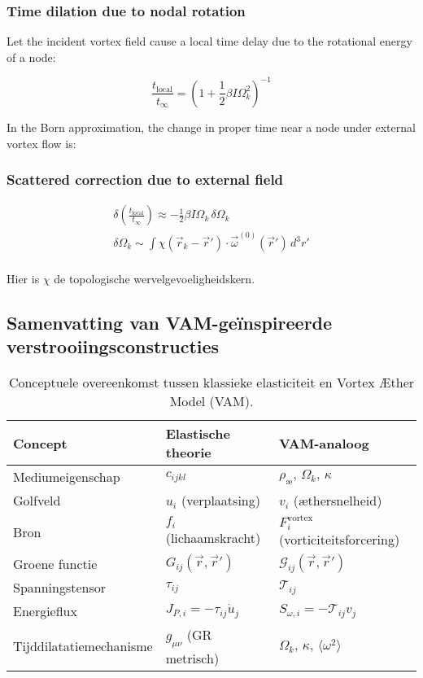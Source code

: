 \subsubsection*{Time dilation due to nodal rotation}

Let the incident vortex field cause a local time delay due to the rotational energy of a node:

\[
    \frac{t_{\text{local}}}{t_{\infty}} = \left(1 + \frac{1}{2} \beta I \Omega_k^2 \right)^{-1}
\]

In the Born approximation, the change in proper time near a node under external vortex flow is:

\subsubsection*{Scattered correction due to external field}

\begin{gather*}
    \delta \left( \frac{t_{\text{local}}}{t_{\infty}} \right) \approx - \frac{1}{2} \beta I \Omega_k \, \delta \Omega_k\\
    \delta \Omega_k \sim \int \chi(\vec{r}_k - \vec{r}') \cdot \vec{\omega}^{(0)}(\vec{r}') \, d^3r'\\
\end{gather*}


Hier is \(\chi\) de topologische wervelgevoeligheidskern.

\subsection{Samenvatting van VAM-geïnspireerde verstrooiingsconstructies}

\begin{table}[htbp]
    \centering
    \begin{tabular}{lll}
        \toprule
        \textbf{Concept} & \textbf{Elastische theorie} & \textbf{VAM-analoog} \\
        \midrule
        Mediumeigenschap & \( c_{ijkl} \) & \( \rho_{\text{\ae}},\, \Omega_k,\, \kappa \) \\
        Golfveld & \( u_i \) (verplaatsing) & \( v_i \) (æthersnelheid) \\
        Bron & \( f_i \) (lichaamskracht) & \( F_i^{\text{vortex}} \) (vorticiteitsforcering) \\
        Groene functie & \( G_{ij}(\vec{r}, \vec{r}') \) & \( \mathcal{G}_{ij}(\vec{r}, \vec{r}') \) \\
        Spanningstensor & \( \tau_{ij} \) & \( \mathcal{T}_{ij} \) \\
        Energieflux & \( J_{P,i} = -\tau_{ij} \dot{u}_j \) & \( S_{\omega,i} = -\mathcal{T}_{ij} v_j \) \\
        Tijddilatatiemechanisme & \( g_{\mu\nu} \) (GR metrisch) & \( \Omega_k,\, \kappa,\, \langle \omega^2 \rangle \) \\
        \bottomrule
    \end{tabular}
    \caption{Conceptuele overeenkomst tussen klassieke elasticiteit en Vortex Æther Model (VAM).}
    \label{tab:elastic-vam-analogy}
\end{table}

